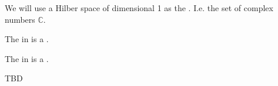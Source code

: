 \begin{example}
  \label{ex:quant_terminal_object}
We will use a Hilber space of dimensional 1 as the
. I.e. the set of complex numbers
$\mathbb{C}$.   
\end{example}

\begin{example}
  \label{ex:quant_product}
  The  in  is a
  .
\end{example}

\begin{example}
  \label{ex:quant_sum}
  The  in  is a
  .
\end{example}

TBD

